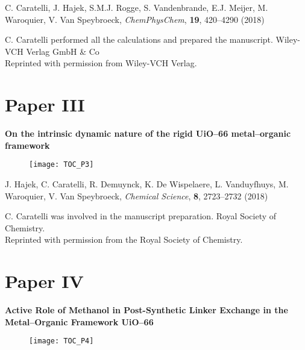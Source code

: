 \noindent
C. Caratelli, J. Hajek, S.M.J. Rogge, S. Vandenbrande, E.J. Meijer, M.
Waroquier, V. Van Speybroeck, \textit{ChemPhysChem}, \textbf{19}, 420--4290
(2018)
\npar

\vfill
\noindent C. Caratelli performed all the calculations and prepared the manuscript.
\npar
\noindent {} Wiley-VCH Verlag GmbH \& Co \\
Reprinted with permission from Wiley-VCH Verlag.

\clearpage{\pagestyle{empty}\cleardoublepage}
% 
\clearpage{\pagestyle{empty}\cleardoublepage}


\section*{Paper III}

\vspace{0.1\textheight}
{
\large
\textbf{On the intrinsic dynamic nature of the rigid UiO--66 metal--organic
framework} }
\begin{figure}[h!]
	\centering
	\texttt{[image: TOC\_P3]}
\end{figure}
 
\noindent
J. Hajek, C. Caratelli, R. Demuynck, K. De Wispelaere, L. Vanduyfhuys, M.
Waroquier, V. Van Speybroeck, \textit{Chemical Science}, \textbf{8}, 2723--2732
(2018)

\vfill

\noindent C. Caratelli was involved in the manuscript preparation.
\npar
\noindent {} Royal Society of Chemistry. \\
Reprinted with permission from the Royal Society of Chemistry.

\clearpage{\pagestyle{empty}\cleardoublepage}
% 
\clearpage{\pagestyle{empty}\cleardoublepage}


\section*{Paper IV}

\vspace{0.1\textheight}
{
\large
\textbf{Active Role of Methanol in Post-Synthetic Linker Exchange in the Metal–Organic Framework UiO--66} }
\begin{figure}[h!]
	\centering
	\texttt{[image: TOC\_P4]}
\end{figure}
 
